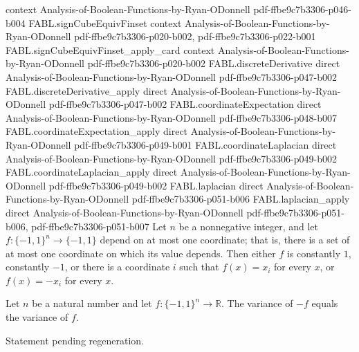 \begin{theorem}
  {context}
  {Analysis-of-Boolean-Functions-by-Ryan-ODonnell}
  {pdf-ffbe9c7b3306-p046-b004}
\proofstep
  {FABL.signCubeEquivFinset}
  {context}
  {Analysis-of-Boolean-Functions-by-Ryan-ODonnell}
  {pdf-ffbe9c7b3306-p020-b002,
    pdf-ffbe9c7b3306-p022-b001}
\proofstep
  {FABL.signCubeEquivFinset_apply_card}
  {context}
  {Analysis-of-Boolean-Functions-by-Ryan-ODonnell}
  {pdf-ffbe9c7b3306-p020-b002}
\proofstep
  {FABL.discreteDerivative}
  {direct}
  {Analysis-of-Boolean-Functions-by-Ryan-ODonnell}
  {pdf-ffbe9c7b3306-p047-b002}
\proofstep
  {FABL.discreteDerivative_apply}
  {direct}
  {Analysis-of-Boolean-Functions-by-Ryan-ODonnell}
  {pdf-ffbe9c7b3306-p047-b002}
\proofstep
  {FABL.coordinateExpectation}
  {direct}
  {Analysis-of-Boolean-Functions-by-Ryan-ODonnell}
  {pdf-ffbe9c7b3306-p048-b007}
\proofstep
  {FABL.coordinateExpectation_apply}
  {direct}
  {Analysis-of-Boolean-Functions-by-Ryan-ODonnell}
  {pdf-ffbe9c7b3306-p049-b001}
\proofstep
  {FABL.coordinateLaplacian}
  {direct}
  {Analysis-of-Boolean-Functions-by-Ryan-ODonnell}
  {pdf-ffbe9c7b3306-p049-b002}
\proofstep
  {FABL.coordinateLaplacian_apply}
  {direct}
  {Analysis-of-Boolean-Functions-by-Ryan-ODonnell}
  {pdf-ffbe9c7b3306-p049-b002}
\proofstep
  {FABL.laplacian}
  {direct}
  {Analysis-of-Boolean-Functions-by-Ryan-ODonnell}
  {pdf-ffbe9c7b3306-p051-b006}
\proofstep
  {FABL.laplacian_apply}
  {direct}
  {Analysis-of-Boolean-Functions-by-Ryan-ODonnell}
  {pdf-ffbe9c7b3306-p051-b006,
    pdf-ffbe9c7b3306-p051-b007}
Let $n$ be a nonnegative integer, and let $f:\{-1,1\}^n\to\{-1,1\}$ depend on at
most one coordinate; that is, there is a set of at most one coordinate on which its
value depends. Then either $f$ is constantly $1$, constantly $-1$, or there is a
coordinate $i$ such that $f(x)=x_i$ for every $x$, or $f(x)=-x_i$ for every $x$.
\end{theorem}

\begin{theorem}
\label{FABL.variance_neg}
\leanok
{}
Let $n$ be a natural number and let $f:\{−1,1\}^n\to\mathbb R$. The variance of $-f$
equals the variance of $f$.
\end{theorem}

\begin{theorem}
\label{FABL.variance_dictator}
\leanok
{}
Statement pending regeneration.
\end{theorem}

